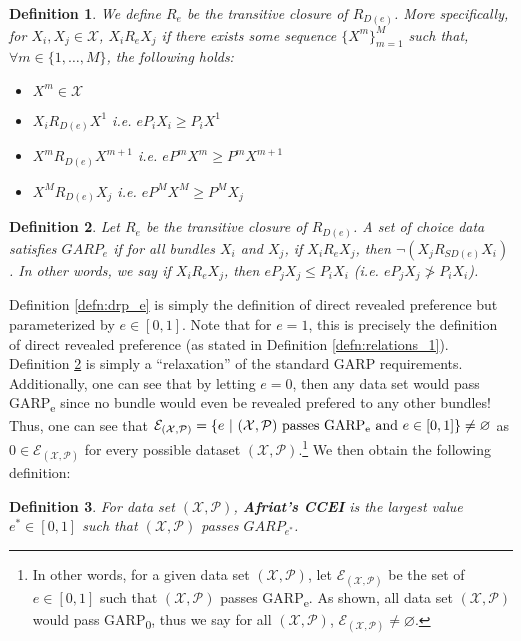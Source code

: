 \documentclass{article} %
\theoremstyle{style1}
\newtheorem{definition}{Definition} %
\theoremstyle{example}
\begin{document}
\begin{definition}\label{defn:rp_e}\leavevmode
We define $R_e$ be the transitive closure of $R_{D(e)}$. More specifically, for $X_i,X_j\in\mathcal{X}$, $X_iR_eX_j$ if there exists some sequence $\{X^m\}_{m=1}^M$ such that, $\forall m\in\{1,\ldots,M\}$, the following holds:
\begin{itemize}[topsep=0pt]
  \item $X^m\in\mathcal{X}$
  \item $X_i R_{D(e)} X^1$ i.e. $eP_iX_i\geq P_i X^1$
  \item $X^m R_{D(e)} X^{m+1}$ i.e. $e P^m X^m \geq P^m X^{m+1}$
  \item $X^M R_{D(e)}X_j$ i.e. $e P^M X^M\geq P^M X_j$
\end{itemize}  
\end{definition}

\begin{definition}\label{defn:GARPe}
Let $R_e$ be the transitive closure of $R_{D(e)}$. A set of choice data satisfies $GARP_e$ if for all bundles $X_i$ and $X_j$, if $X_i R_e X_j$, then $\neg (X_j R_{SD(e)} X_i)$. In other words, we say if $X_i R_e X_j$, then $eP_jX_j \leq P_iX_i$ (i.e. $eP_jX_j \not> P_iX_i$).
\end{definition}
Definition \ref{defn:drp_e} is simply the definition of direct revealed preference but parameterized by $e\in[0,1]$. Note that for $e=1$, this is precisely the definition of direct revealed preference (as stated in Definition \ref{defn:relations_1}). Definition \ref{defn:GARPe} is simply a ``relaxation'' of the standard GARP requirements. Additionally, one can see that by letting $e=0$, then any data set would pass GARP\textsubscript{e} since no bundle would even be revealed prefered to any other bundles! Thus, one can see that $\mathcal{E}_{(\mathcal{X},\mathcal{P})}=\{e\ |\ (\mathcal{X},\mathcal{P})\textrm{ passes GARP\textsubscript{e}}\textrm{ and } e\in[0,1]\}\not=\varnothing$ as $0\in\mathcal{E}_{(\mathcal{X},\mathcal{P})}$ for every possible dataset $(\mathcal{X},\mathcal{P})$.\footnote{In other words, for a given data set $(\mathcal{X},\mathcal{P})$, let $\mathcal{E}_{(\mathcal{X},\mathcal{P})}$ be the set of $e\in[0,1]$ such that $(\mathcal{X},\mathcal{P})$ passes GARP\textsubscript{e}. As shown, all data set $(\mathcal{X},\mathcal{P})$ would pass GARP\textsubscript{0}, thus we say for all $(\mathcal{X},\mathcal{P})$, $\mathcal{E}_{(\mathcal{X},\mathcal{P})}\not=\varnothing$.} We then obtain the following definition:

\begin{definition}\label{defn:Afriat_CCEI}
For data set $(\mathcal{X},\mathcal{P})$, \textbf{Afriat's CCEI} is the \emph{largest} value $e^*\in[0,1]$ such that $(\mathcal{X},\mathcal{P})$ passes $GARP_{e^*}$.
\end{definition}
\end{document}
